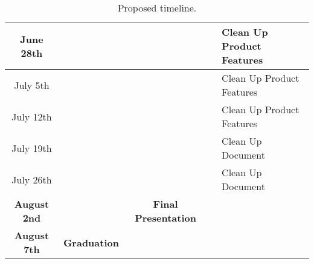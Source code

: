 \begin{table}[h!]
{\begin{tabular}{|S|L|S|L|L|}
      June 28th                     &                       &                                  &                                        & Clean Up Product Features            \\ \hline
      July 5th                      &                       &                                  &                                        & Clean Up Product Features            \\ \hline
      July 12th                     &                       &                                  &                                        & Clean Up Product Features            \\ \hline
      July 19th                     &                       &                                  &                                        & Clean Up Document                    \\ \hline
      July 26th                     &                       &                                  &                                        & Clean Up Document                    \\ \hline
      \textbf{August 2nd}           & \textbf{}             & \textbf{Final Presentation}      & \textbf{}                              & \textbf{}                            \\ \hline
      \textbf{August 7th}           & \textbf{Graduation}   & \textbf{}                        & \textbf{}                              & \textbf{}                            \\ \hline
    \end{tabular}}
  \caption{Proposed timeline.}
  \label{Tab:milestones}
\end{table}
\clearpage
